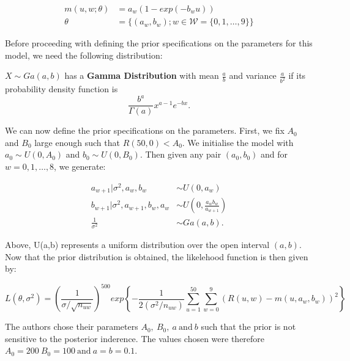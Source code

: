 \begin{align}
    \label{mdef}
        m(u,w;\theta) &= a_w(1-exp(-b_wu)) \\
               \theta &= \{ (a_w,b_w); w \in \mathcal{W}=\{0,1,\ldots,9\} \} 
\end{align}

Before proceeding with defining the prior specifications on the parameters for this model, we need the following distribution:

\begin{definition}
    $X \sim Ga(a,b)$ has a \textbf{Gamma Distribution} with mean $\frac{a}{b}$ and variance $\frac{a}{b^2}$ if its probability density function is
    $$
        \frac{b^a}{\Gamma(a)} x^{a-1}e^{-bx}.  
    $$
\end{definition}

We can now define the prior specifications on the parameters. First, we fix $A_0$ and $B_0$ large enough such that $R(50,0) < A_0$. We initialise  the model with
$a_0 \sim U(0,A_0)$ and $b_0 \sim U(0,B_0)$. Then given any pair $(a_0,b_0)$ and for $w=0,1,\ldots,8$, we generate:

\begin{align}
    a_{w+1}|\sigma^2,a_w,b_w &\sim U(0,a_w) \\
    b_{w+1}|\sigma^2,a_{w+1},b_w,a_w &\sim U\left(0,\frac{a_wb_w}{a_{w+1}}\right) \\
    \frac{1}{\sigma^2} &\sim Ga(a,b).
\end{align}

Above, U(a,b) represents a uniform distribution over the open interval $(a,b)$. Now that the prior distribution is obtained, the likelehood function is then 
given by:

\begin{equation}
    L(\theta,\sigma^2) = \left( \frac{1}{\sigma / \sqrt{n_{uw}}} \right)^{500} exp \left\{ - \frac{1}{2(\sigma^2 / n_{uw})} \sum_{u=1}^{50} \sum_{w=0}^9 (R(u,w)-m(u,a_w,b_w))^2  \right\}
\end{equation}

The authors chose their parameters $A_0, \ B_0, \ a \ \text{and} \ b$ such that the prior is not sensitive to the posterior inderence. The values chosen
were therefore $A_0=200 \ B_0=100 \ \text{and} \ a=b=0.1$.